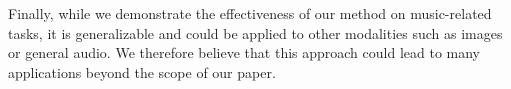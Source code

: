 \documentclass{article}
\begin{document}
Finally, while we demonstrate the effectiveness of our method on music-related tasks, it is generalizable and could be applied to other modalities such as images or general audio. We therefore believe that this approach could lead to many applications beyond the scope of our paper.



\end{document}
